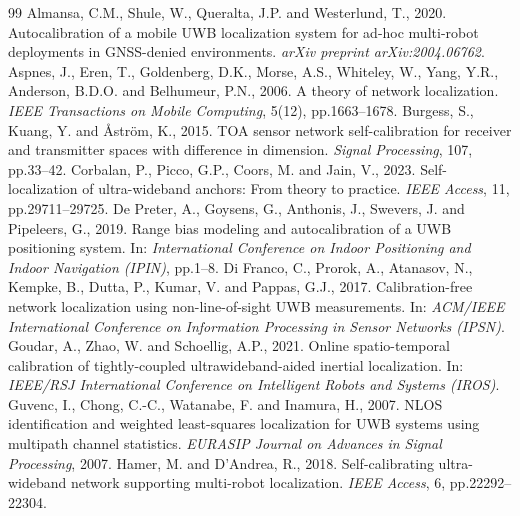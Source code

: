 \documentclass[10pt,a4paper]{article}
\begin{document}
\begingroup
\scriptsize
\clearpage
\begin{thebibliography}{99}
 Almansa, C.M., Shule, W., Queralta, J.P. and Westerlund, T., 2020. Autocalibration of a mobile UWB localization system for ad-hoc multi-robot deployments in GNSS-denied environments. \emph{arXiv preprint arXiv:2004.06762}.
 Aspnes, J., Eren, T., Goldenberg, D.K., Morse, A.S., Whiteley, W., Yang, Y.R., Anderson, B.D.O. and Belhumeur, P.N., 2006. A theory of network localization. \emph{IEEE Transactions on Mobile Computing}, 5(12), pp.1663--1678.
 Burgess, S., Kuang, Y. and \AA{}str\"om, K., 2015. TOA sensor network self-calibration for receiver and transmitter spaces with difference in dimension. \emph{Signal Processing}, 107, pp.33--42.
 Corbalan, P., Picco, G.P., Coors, M. and Jain, V., 2023. Self-localization of ultra-wideband anchors: From theory to practice. \emph{IEEE Access}, 11, pp.29711--29725.
 De Preter, A., Goysens, G., Anthonis, J., Swevers, J. and Pipeleers, G., 2019. Range bias modeling and autocalibration of a UWB positioning system. In: \emph{International Conference on Indoor Positioning and Indoor Navigation (IPIN)}, pp.1--8.
 Di Franco, C., Prorok, A., Atanasov, N., Kempke, B., Dutta, P., Kumar, V. and Pappas, G.J., 2017. Calibration-free network localization using non-line-of-sight UWB measurements. In: \emph{ACM/IEEE International Conference on Information Processing in Sensor Networks (IPSN)}.
 Goudar, A., Zhao, W. and Schoellig, A.P., 2021. Online spatio-temporal calibration of tightly-coupled ultrawideband-aided inertial localization. In: \emph{IEEE/RSJ International Conference on Intelligent Robots and Systems (IROS)}.
 Guvenc, I., Chong, C.-C., Watanabe, F. and Inamura, H., 2007. NLOS identification and weighted least-squares localization for UWB systems using multipath channel statistics. \emph{EURASIP Journal on Advances in Signal Processing}, 2007.
 Hamer, M. and D'Andrea, R., 2018. Self-calibrating ultra-wideband network supporting multi-robot localization. \emph{IEEE Access}, 6, pp.22292--22304.

\end{thebibliography}
\end{document}
